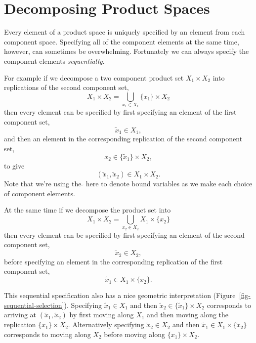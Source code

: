 \documentclass[
  letterpaper,
  DIV=11,
  numbers=noendperiod]{scrartcl}
\begin{document}
\hypertarget{sec:decomposition}{%
\section{Decomposing Product Spaces}\label{sec:decomposition}}

Every element of a product space is uniquely specified by an element
from each component space. Specifying all of the component elements at
the same time, however, can sometimes be overwhelming. Fortunately we
can always specify the component elements \emph{sequentially}.

For example if we decompose a two component product set
\(X_{1} \times X_{2}\) into replications of the second component set, \[
X_{1} \times X_{2} = \bigcup_{x_{1} \in X_{1} } \{ x_{1} \} \times X_{2}
\] then every element can be specified by first specifying an element of
the first component set, \[
\tilde{x}_{1} \in X_{1},
\] and then an element in the corresponding replication of the second
component set, \[
x_{2} \in \{ \tilde{x}_{1} \} \times X_{2},
\] to give \[
(\tilde{x}_{1}, \tilde{x}_{2}) \in X_{1} \times X_{2}.
\] Note that we're using the \(\tilde{}\) here to denote bound variables
as we make each choice of component elements.

At the same time if we decompose the product set into \[
X_{1} \times X_{2} = \bigcup_{x_{2} \in X_{2} } X_{1} \times \{ x_{2} \}
\] then every element can be specified by first specifying an element of
the second component set, \[
\tilde{x}_{2} \in X_{2},
\] before specifying an element in the corresponding replication of the
first component set, \[
\tilde{x}_{1} \in X_{1} \times \{ x_{2} \}.
\]

This sequential specification also has a nice geometric interpretation
(Figure~\ref{fig-sequential-selection}). Specifying
\(\tilde{x}_{1} \in X_{1}\) and then
\(\tilde{x}_{2} \in \{ \tilde{x}_{1} \} \times X_{2}\) corresponds to
arriving at \((\tilde{x}_{1}, \tilde{x}_{2})\) by first moving along
\(X_{1}\) and then moving along the replication
\(\{ x_{1} \} \times X_{2}\). Alternatively specifying
\(\tilde{x}_{2} \in X_{2}\) and then
\(\tilde{x}_{1} \in X_{1} \times \{ \tilde{x}_{2} \}\) corresponds to
moving along \(X_{2}\) before moving along \(\{ x_{1} \} \times X_{2}\).
\end{document}
